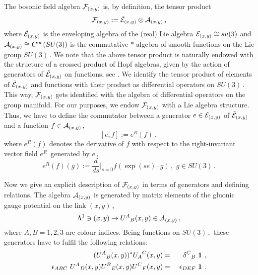 \documentclass[a4paper,12pt]{article}
\begin{document}
The bosonic field algebra ${\cal F}_{(x,y)}$ is, by definition,
the tensor product
\begin{equation}
\label{balgebra-xy} {\cal F}_{(x,y)} :=  \tilde{\cal E}_{(x,y)}
\otimes {\cal A}_{(x,y)} \, ,
\end{equation}
where $\tilde{\cal E}_{(x,y)}$ is the enveloping algebra of the
(real) Lie algebra ${\cal E}_{(x,y)} \cong su(3)$ and ${\cal
A}_{(x,y)} \cong C^\infty(SU(3))$ is the commutative $*$-algebra
of smooth functions on the Lie group $SU(3) \, .$ We note that the
above tensor product is naturally endowed with the structure of a
crossed product of Hopf algebras, given by the action of
generators of $\tilde{\cal E}_{(x,y)}$ on functions, see
\cite{KS}. We identify the tensor product of elements of
$\tilde{\cal E}_{(x,y)}$ and functions with their product as
differential operators on $SU(3) \, .$ This way, ${\cal
F}_{(x,y)}$ gets identified with the algebra of differential
operators on the group manifold. For our purposes, we endow ${\cal
F}_{(x,y)}$ with a Lie algebra structure. Thus, we have to define
the commutator between a generator $e \in {\cal E}_{(x,y)}$ of
$\tilde{\cal E}_{(x,y)}$ and a function $f \in {\cal A}_{(x,y)} \,
,$
\begin{equation}
\label{commut-e-f} [e , f ] := e^R(f)  \ ,
\end{equation}
where $e^R(f)$ denotes the derivative of $f$ with respect to the
right-invariant vector field $e^R \, $ generated by $e \, ,$
\begin{equation}\label{derivative}
e^R(f)(g) := \frac d{ds}{\Big |}_{s=0} f(\exp (se)\cdot g) \, , \,
\, g \in SU(3) \, .
\end{equation}

Now we give an explicit description of ${\cal F}_{(x,y)}$ in terms
of generators and defining relations. The algebra  ${\cal
A}_{(x,y)}$ is generated by matrix elements of the gluonic gauge
potential on the link $(x,y) \, ,$
\begin{equation}
{\Lambda}^1 \ni (x,y) \rightarrow  {U^A}_B(x,y) \in  {\cal
A}_{(x,y)} \, ,
\end{equation}
where $A,B = 1,2,3$ are colour indices. Being functions on $SU(3)
\, ,$ these generators have to fulfil the following relations:
\begin{eqnarray}
\label{unitary1} ({U^A}_B(x,y))^* {U_A}^C(x,y) & = & {\delta^C}_B
\ {\bf 1} \ ,
\\
\epsilon_{ABC}\  {U^A}_D(x,y) {U^B}_E(x,y) {U^C}_F(x,y) & = & \
\epsilon_{DEF} \ {\bf 1} \ . \label{unitary2}
\end{eqnarray}
\end{document}

